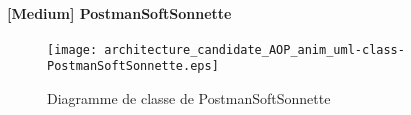 
    
                
                

    \paragraph{[Medium] PostmanSoftSonnette}

        \begin{figure} [H]
            \centering
            \texttt{[image: architecture\_candidate\_AOP\_anim\_uml-class-PostmanSoftSonnette.eps]}
            \caption{Diagramme de classe de PostmanSoftSonnette}
            \label{Classe-PostmanSoftSonnette}
        \end{figure}
    
